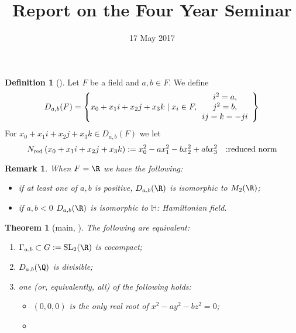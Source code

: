 \documentclass[a4paper,12pt]{article}
\title{Report on the Four Year Seminar}
\date{17 May 2017}
\newtheorem{theorem}{Theorem}
\newtheorem{remark}{Remark}
\theoremstyle{definition}
\newtheorem{definition}{Definition}
\begin{document}
\maketitle
\begin{definition}[{\cite[2.2]{bergeron2016spectrum}}]
	Let $F$ be a field and $a,b\in F$. We define\begin{equation*}
		D_{a,b}(F)=\left\{ x_0+x_1i+x_2j+x_3k\mid x_i\in F,\begin{array}[]{c}
		i^2=a,\\ j^2=b,\\ ij=k=-ji
	\end{array}\right\}
	\end{equation*}
	For $x_0+x_1i+x_2j+x_3k\in D_{a,b}(F)$ we let\begin{equation*}
		N_{\mbox{\scriptsize red}}\left(  x_0+x_1i+x_2j+x_3k\right):=x_0^2-ax_1^2-bx_2^2+abx_3^2\quad\mbox{:reduced norm}
	\end{equation*}
\end{definition}
\begin{remark}
	When $F=\R$ we have the following:\begin{itemize}
		\item if at least one of $a,b$ is positive, $D_{a,b}(\R)$ is isomorphic to $M_2(\R)$;
		\item if $a,b<0$ $D_{a,b}(\R)$ is isomorphic to $\mathbb{H}$: Hamiltonian field.
	\end{itemize}
\end{remark}
\begin{theorem}[main, {\cite[Thm. 2.3, 3.]{bergeron2016spectrum}}]
	The following are equivalent:
	\begin{enumerate}
		\item $\Gamma_{a,b}\subset G:=\mbox{\normalfont SL}_2(\R)$ is cocompact;
		\item $D_{a,b}(\Q)$ is divisible;
		\item one (or, equivalently, all) of the following holds:\begin{itemize}
				\item $(0,0,0)$ is the only real root of $x^2-ay^2-bz^2=0$;
				\item
			\end{itemize}
	\end{enumerate}
\end{theorem}


\end{document}
